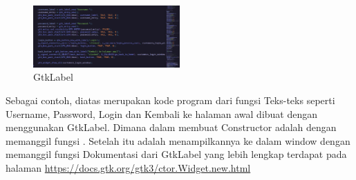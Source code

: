 \documentclass[a4paper,12pt]{article}
\begin{document}
\begin{figure}[!htbp]
    \centering
    \includegraphics[width=0.5\textwidth]{./docs_label.png}
    \caption{GtkLabel}

\end{figure}
\FloatBarrier 

Sebagai contoh, diatas merupakan kode program dari fungsi \texttt{}
Teks-teks seperti Username, Password, Login dan Kembali ke halaman awal dibuat dengan menggunakan GtkLabel. Dimana dalam membuat Constructor adalah dengan memanggil fungsi
\texttt{}. Setelah itu adalah menampilkannya ke dalam window dengan memanggil fungsi \texttt{}
Dokumentasi dari GtkLabel yang lebih lengkap terdapat pada halaman \url{https://docs.gtk.org/gtk3/ctor.Widget.new.html}
\end{document}
